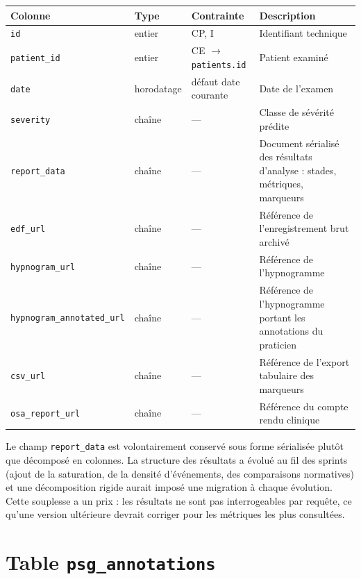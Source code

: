 \begin{table}[H]
\centering
\small
\begin{tabular}{@{}lllL{5.4cm}@{}}
\toprule
\textbf{Colonne} & \textbf{Type} & \textbf{Contrainte} & \textbf{Description} \\
\midrule
\texttt{id}          & entier     & CP, I & Identifiant technique \\
\texttt{patient\_id} & entier     & CE $\to$ \texttt{patients.id} & Patient examiné \\
\texttt{date}        & horodatage & défaut date courante & Date de l'examen \\
\texttt{severity}    & chaîne     & --- & Classe de sévérité prédite \\
\texttt{report\_data}& chaîne     & --- & Document sérialisé des résultats d'analyse :
                                          stades, métriques, marqueurs \\
\texttt{edf\_url}    & chaîne     & --- & Référence de l'enregistrement brut archivé \\
\texttt{hypnogram\_url} & chaîne  & --- & Référence de l'hypnogramme \\
\texttt{hypnogram\_annotated\_url} & chaîne & --- & Référence de l'hypnogramme portant
                                          les annotations du praticien \\
\texttt{csv\_url}    & chaîne     & --- & Référence de l'export tabulaire des
                                          marqueurs \\
\texttt{osa\_report\_url} & chaîne& --- & Référence du compte rendu clinique \\
\bottomrule
\end{tabular}
\end{table}

\noindent
Le champ \texttt{report\_data} est volontairement conservé sous forme sérialisée
plutôt que décomposé en colonnes. La structure des résultats a évolué au fil des
sprints (ajout de la saturation, de la densité d'événements, des comparaisons
normatives) et une décomposition rigide aurait imposé une migration à chaque
évolution. Cette souplesse a un prix : les résultats ne sont pas interrogeables par
requête, ce qu'une version ultérieure devrait corriger pour les métriques les plus
consultées.

\section{Table \texttt{psg\_annotations}}

